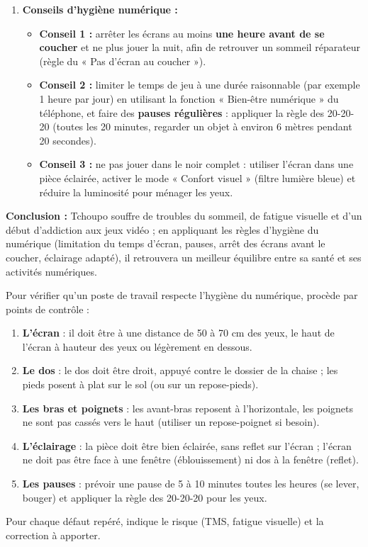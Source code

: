 \documentclass[11pt]{article}
\begin{document}
\begin{exoresolu}
\begin{enumerate}
\item \textbf{Conseils d'hygiène numérique :}
\begin{itemize}
\item \textbf{Conseil 1 :} arrêter les écrans au moins \textbf{une heure avant de se coucher} et ne plus jouer la nuit, afin de retrouver un sommeil réparateur (règle du « Pas d'écran au coucher »).
\item \textbf{Conseil 2 :} limiter le temps de jeu à une durée raisonnable (par exemple 1 heure par jour) en utilisant la fonction « Bien-être numérique » du téléphone, et faire des \textbf{pauses régulières} : appliquer la règle des 20-20-20 (toutes les 20 minutes, regarder un objet à environ 6 mètres pendant 20 secondes).
\item \textbf{Conseil 3 :} ne pas jouer dans le noir complet : utiliser l'écran dans une pièce éclairée, activer le mode « Confort visuel » (filtre lumière bleue) et réduire la luminosité pour ménager les yeux.
\end{itemize}
\end{enumerate}
\textbf{Conclusion :} Tchoupo souffre de troubles du sommeil, de fatigue visuelle et d'un début d'addiction aux jeux vidéo ; en appliquant les règles d'hygiène du numérique (limitation du temps d'écran, pauses, arrêt des écrans avant le coucher, éclairage adapté), il retrouvera un meilleur équilibre entre sa santé et ses activités numériques.
\end{exoresolu}

\begin{methode}
Pour vérifier qu'un poste de travail respecte l'hygiène du numérique, procède par points de contrôle :
\begin{enumerate}
\item \textbf{L'écran} : il doit être à une distance de 50 à 70 cm des yeux, le haut de l'écran à hauteur des yeux ou légèrement en dessous.
\item \textbf{Le dos} : le dos doit être droit, appuyé contre le dossier de la chaise ; les pieds posent à plat sur le sol (ou sur un repose-pieds).
\item \textbf{Les bras et poignets} : les avant-bras reposent à l'horizontale, les poignets ne sont pas cassés vers le haut (utiliser un repose-poignet si besoin).
\item \textbf{L'éclairage} : la pièce doit être bien éclairée, sans reflet sur l'écran ; l'écran ne doit pas être face à une fenêtre (éblouissement) ni dos à la fenêtre (reflet).
\item \textbf{Les pauses} : prévoir une pause de 5 à 10 minutes toutes les heures (se lever, bouger) et appliquer la règle des 20-20-20 pour les yeux.
\end{enumerate}
Pour chaque défaut repéré, indique le risque (TMS, fatigue visuelle) et la correction à apporter.
\end{methode}
\end{document}

